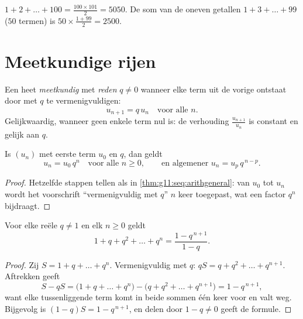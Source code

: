 \begin{example}
$1 + 2 + \dots + 100 = \frac{100 \times 101}{2} = 5050$. De som van de
oneven getallen $1 + 3 + \dots + 99$ ($50$ termen) is
$50 \times \frac{1 + 99}{2} = 2500$.
\end{example}

\section{Meetkundige rijen}

\begin{definition}\label{def:g11:seq:geometric}
Een  heet \emph{meetkundig} met
\emph{reden} $q \neq 0$ wanneer elke term uit de vorige ontstaat
door met $q$ te vermenigvuldigen:
\[
u_{n+1} = q\,u_n \quad \text{voor alle } n.
\]
Gelijkwaardig, wanneer geen enkele term nul is: de verhouding
$\frac{u_{n+1}}{u_n}$ is constant en gelijk aan $q$.
\end{definition}

\begin{theorem}\label{thm:g11:seq:geomgeneral}
Is $(u_n)$  met eerste term $u_0$ en  $q$, dan geldt
\[
u_n = u_0\, q^n \quad \text{voor alle } n \geq 0,
\qquad\text{en algemener } u_n = u_p\, q^{\,n-p} .
\]
\end{theorem}

\begin{proof}
Hetzelfde stappen tellen als in \cref{thm:g11:seq:arithgeneral}: van $u_0$
tot $u_n$ wordt het voorschrift ``vermenigvuldig met $q$'' $n$ keer
toegepast, wat een factor $q^n$ bijdraagt.
\end{proof}

\begin{theorem}\label{thm:g11:seq:geomsum}
Voor elke reële $q \neq 1$ en elk  $n \geq 0$ geldt
\[
1 + q + q^2 + \dots + q^n = \frac{1 - q^{\,n+1}}{1 - q}.
\]
\end{theorem}

\begin{proof}
Zij $S = 1 + q + \dots + q^n$. Vermenigvuldig met $q$:
$qS = q + q^2 + \dots + q^{n+1}$. Aftrekken geeft
\[
S - qS = \bigl(1 + q + \dots + q^n\bigr)
- \bigl(q + q^2 + \dots + q^{n+1}\bigr) = 1 - q^{\,n+1},
\]
want elke tussenliggende term komt in beide sommen één keer voor en valt
weg. Bijgevolg is $(1 - q)S = 1 - q^{\,n+1}$, en delen door $1 - q \neq 0$
geeft de formule.
\end{proof}

